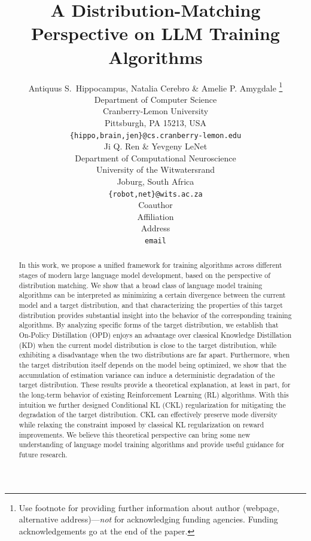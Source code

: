 \documentclass{article} %
\title{A Distribution-Matching Perspective on LLM Training Algorithms}
\author{Antiquus S.~Hippocampus, Natalia Cerebro \& Amelie P. Amygdale \thanks{ Use footnote for providing further information
about author (webpage, alternative address)---\emph{not} for acknowledging
funding agencies.  Funding acknowledgements go at the end of the paper.} \\
Department of Computer Science\\
Cranberry-Lemon University\\
Pittsburgh, PA 15213, USA \\
\texttt{\{hippo,brain,jen\}@cs.cranberry-lemon.edu} \\
\And
Ji Q. Ren \& Yevgeny LeNet \\
Department of Computational Neuroscience \\
University of the Witwatersrand \\
Joburg, South Africa \\
\texttt{\{robot,net\}@wits.ac.za} \\
\AND
Coauthor \\
Affiliation \\
Address \\
\texttt{email}
}
\begin{document}
\maketitle

\begin{abstract}
In this work, we propose a unified framework for training algorithms across different stages of modern large language model development, based on the perspective of distribution matching. We show that a broad class of language model training algorithms can be interpreted as minimizing a certain divergence between the current model and a target distribution, and that characterizing the properties of this target distribution provides substantial insight into the behavior of the corresponding training algorithms.
By analyzing specific forms of the target distribution, we establish that On-Policy Distillation (OPD) enjoys an advantage over classical Knowledge Distillation (KD) when the current model distribution is close to the target distribution, while exhibiting a disadvantage when the two distributions are far apart. Furthermore, when the target distribution itself depends on the model being optimized, we show that the accumulation of estimation variance can induce a deterministic degradation of the target distribution.
These results provide a theoretical explanation, at least in part, for the long-term behavior of existing Reinforcement Learning (RL) algorithms. With this intuition we further designed Conditional KL (CKL) regularization for mitigating the degradation of the target distribution. CKL can effectively preserve mode diversity while relaxing the constraint imposed by classical KL regularization on reward improvements. We believe this theoretical perspective can bring some new understanding of language model training algorithms and provide useful guidance for future research.
\end{abstract}


















\clearpage
\appendix
{}









% 




\end{document}
